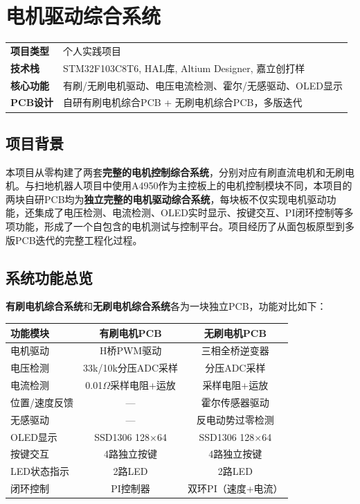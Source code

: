 \documentclass[12pt,a4paper]{ctexart}
\begin{document}
\newpage
\section{电机驱动综合系统}

\begin{infobox}[项目概况]
\begin{tabular}{ll}
\textbf{项目类型} & 个人实践项目 \\
\textbf{技术栈}   & STM32F103C8T6, HAL库, Altium Designer, 嘉立创打样 \\
\textbf{核心功能} & 有刷/无刷电机驱动、电压电流检测、霍尔/无感驱动、OLED显示 \\
\textbf{PCB设计}  & 自研有刷电机综合PCB + 无刷电机综合PCB，多版迭代
\end{tabular}
\end{infobox}

\subsection{项目背景}

本项目从零构建了两套\textbf{完整的电机控制综合系统}，分别对应有刷直流电机和无刷电机。与扫地机器人项目中使用A4950作为主控板上的电机控制模块不同，本项目的两块自研PCB均为\textbf{独立完整的电机驱动综合系统}，每块板不仅实现电机驱动功能，还集成了电压检测、电流检测、OLED实时显示、按键交互、PI闭环控制等多项功能，形成了一个自包含的电机测试与控制平台。项目经历了从面包板原型到多版PCB迭代的完整工程化过程。

\subsection{系统功能总览}

\textbf{有刷电机综合系统}和\textbf{无刷电机综合系统}各为一块独立PCB，功能对比如下：

\begin{center}
\begin{tabular}{lcc}
\toprule
\textbf{功能模块} & \textbf{有刷电机PCB} & \textbf{无刷电机PCB} \\
\midrule
电机驱动         & H桥PWM驱动           & 三相全桥逆变器 \\
电压检测         & 33k/10k分压ADC采样   & 分压ADC采样 \\
电流检测         & 0.01$\Omega$采样电阻+运放  & 采样电阻+运放 \\
位置/速度反馈    & ---                  & 霍尔传感器驱动 \\
无感驱动         & ---                  & 反电动势过零检测 \\
OLED显示         & SSD1306 128$\times$64  & SSD1306 128$\times$64 \\
按键交互         & 4路独立按键          & 4路独立按键 \\
LED状态指示      & 2路LED               & 2路LED \\
闭环控制         & PI控制器             & 双环PI（速度+电流） \\
\bottomrule
\end{tabular}
\end{center}
\end{document}
